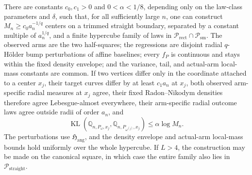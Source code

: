 There are constants \(c_0,c_1>0\) and \(0<\alpha<1/8\), depending only on the law-class parameters and \(\delta\), such that, for all sufficiently large \(n\), one can construct \(M_n\geq c_0a_n^{-1/q}\) centers on a trimmed straight boundary, separated by a constant multiple of \(a_n^{1/q}\), and a finite hypercube family of laws in \(\mathcal P_{\mathrm{rect}}\cap\mathcal P_{\mathrm{sm}}\).  The observed arms are the two half-squares; the regressions are disjoint radial \(q\)-H\"older bump perturbations of affine baselines; every \(f_P\) is continuous and stays within the fixed density envelope; and the variance, tail, and actual-arm local-mass constants are common.  If two vertices differ only in the coordinate attached to a center \(x_j\), their target curves differ by at least \(c_1a_n\) at \(x_j\), both observed arm-specific radial measures at \(x_j\) agree, their fixed Radon--Nikodym densities therefore agree Lebesgue-almost everywhere, their arm-specific radial outcome laws agree outside radii of order \(a_n\), and
\[
 \operatorname{KL}\!\left(\mathbb Q_{n,P_\omega,x_j},\mathbb Q_{n,P_{\omega^{(j)}},x_j}\right)
 \leq\alpha\log M_n.
\]
The perturbations use \(\mathfrak H_{\mathrm{ang}}\), and the density envelope and actual-arm local-mass bounds hold uniformly over the whole hypercube.  If \(L>4\), the construction may be made on the canonical square, in which case the entire family also lies in \(\mathcal P_{\mathrm{straight}}\).